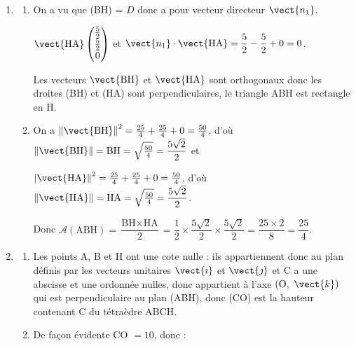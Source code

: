 \begin{enumerate}
\begin{enumerate}
Donc H$\left(\dfrac52~;~\dfrac52~;~0\right)$.
		\item On a $M(x~;~y~;~z) \in D \iff \left\{\begin{array}{l c l}
x&=&0 + \frac52 t\\
y &=&5 - \frac52 t\\
z&=&0 + 0t
\end{array}\right.$

On reconnait dans les coefficients de $t$ les coordonnées du vecteur $\begin{pmatrix}\frac52\\- \frac52\\0\end{pmatrix}$, soit $\frac52\vect{n_1}$ et (0~;~5~;~0) sont les coordonnées de B.

Donc $D$ est la droite contenant B et de vecteur directeur $\vect{n_1}$.

Or on a vu que le vecteur $\vect{n_1}$ est normal au plan (CAD), donc la droite $D$ est perpendiculaire à (CAD) au point H.
	\end{enumerate}
\item 
	\begin{enumerate}
		\item On a vu que (BH) = $D$ donc a pour vecteur directeur $\vect{n_1}$.
		
$\vect{\text{HA}}\begin{pmatrix}\frac52\\\frac52\\0\end{pmatrix}$ et $\vect{n_1} \cdot \vect{\text{HA}} = \dfrac52 - \dfrac52 + 0 = 0$.
		
Les vecteurs $\vect{\text{BH}}$ et $\vect{\text{HA}}$ sont orthogonaux donc les droites (BH) et (HA) sont perpendiculaires, le triangle ABH est rectangle en H.
		\item On a $\left\|\vect{\text{BH}}\right\|^2 = \frac{25}{4} + \frac{25}{4} + 0 = \frac{50}{4}$, d'où $\left\|\vect{\text{BH}}\right\| = \text{BH} = \sqrt{\frac{50}{4}} = \dfrac{5\sqrt 2}{2}$ et 
		
$\left|\vect{\text{HA}}\right\|^2 = \frac{25}{4} + \frac{25}{4} + 0 = \frac{50}{4}$, d'où $\left\|\vect{\text{HA}}\right\| = \text{HA} = \sqrt{\frac{50}{4}} = \dfrac{5\sqrt 2}{2}$.

Donc $\mathcal{A}(\text{ABH}) = \dfrac{\text{BH} \times \text{HA}}{2} = \dfrac12 \times \dfrac{5\sqrt 2}{2} \times \dfrac{5\sqrt 2}{2} = \dfrac{25 \times 2}{8} = \dfrac{25}{4}$.
	\end{enumerate}
\item 
	\begin{enumerate}
		\item Les points A, B et H ont une cote nulle : ils appartiennent donc au plan définis par les vecteurs unitaires $\vect{\imath}$ et $\vect{\jmath}$ et C a une abscisse et une ordonnée nulles, donc appartient à l'axe $\left(\text{O},~\vect{k}\right)$ qui est perpendiculaire au plan (ABH), donc (CO) est la hauteur contenant C du tétraèdre ABCH.
		\item De façon évidente CO $ = 10$, donc :
		

\end{enumerate}
\end{enumerate}
